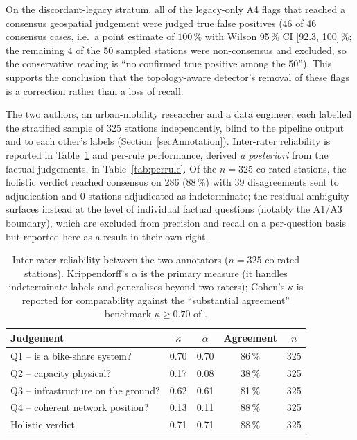 \documentclass[11pt,a4paper]{article}
\begin{document}
On the discordant-legacy stratum, all of the legacy-only A4 flags that
reached a consensus geospatial judgement were judged true false positives
(46 of 46 consensus cases, i.e.\ a point estimate of $100\,\%$ with
Wilson 95\,\% CI [92.3, 100]\,\%; the remaining 4 of the 50 sampled stations
were non-consensus and excluded, so the conservative reading is ``no
confirmed true positive among the 50''). This supports the conclusion that
the topology-aware detector's removal of these flags is a correction rather
than a loss of recall.

The two authors, an urban-mobility researcher and a data engineer, each
labelled the stratified sample of 325 stations independently, blind
to the pipeline output and to each other's labels (Section~\ref{secAnnotation}).
Inter-rater reliability is reported in Table~\ref{tab:irr} and per-rule performance,
derived \emph{a posteriori} from the factual judgements, in
Table~\ref{tab:perrule}. Of the $n=325$ co-rated stations, the holistic
verdict reached consensus on 286 (88\,\%) with 39
disagreements sent to adjudication and 0 stations adjudicated as
indeterminate; the residual ambiguity surfaces instead at the level of
individual factual questions (notably the A1/A3 boundary), which are
excluded from precision and recall on a per-question basis but reported
here as a result in their own right.

\begin{table}[!htbp]
\centering
\caption{Inter-rater reliability between the two annotators
($n=325$ co-rated stations). Krippendorff's $\alpha$
\cite{Krippendorff2018Content} is the primary measure (it handles
indeterminate labels and generalises beyond two raters); Cohen's $\kappa$
\cite{Cohen1960Kappa} is reported for comparability against the
``substantial agreement'' benchmark $\kappa \geq 0.70$ of
\cite{Landis1977Agreement}.}
\label{tab:irr}
\small
\begin{tabular}{@{}lcccc@{}}
\toprule
\textbf{Judgement} & \textbf{$\kappa$} & \textbf{$\alpha$}
                   & \textbf{Agreement} & \textbf{$n$}\\
\midrule
Q1 -- is a bike-share system?       & 0.70 & 0.70 & 86\,\% & 325\\
Q2 -- capacity physical?            & 0.17 & 0.08 & 38\,\% & 325\\
Q3 -- infrastructure on the ground? & 0.62 & 0.61 & 81\,\% & 325\\
Q4 -- coherent network position?    & 0.13 & 0.11 & 88\,\% & 325\\
Holistic verdict                    & 0.71 & 0.71 & 88\,\% & 325\\
\bottomrule
\end{tabular}
\end{table}
\end{document}
